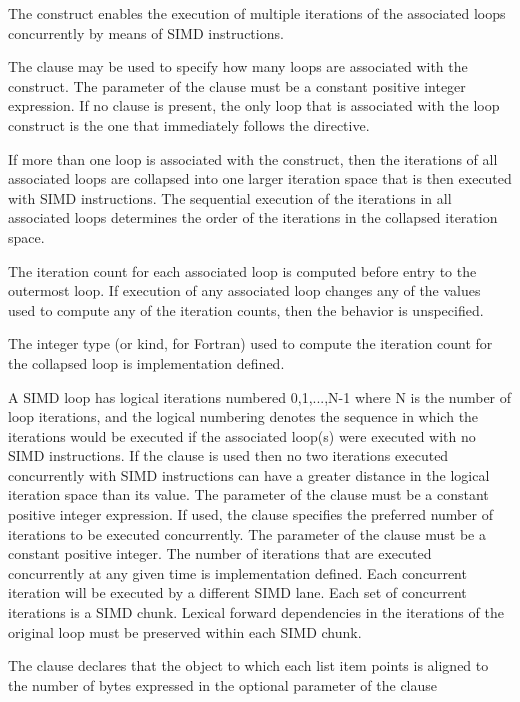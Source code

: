 \descr
The  construct enables the execution of multiple iterations of the associated loops 
concurrently by means of SIMD instructions.

The  clause may be used to specify how many loops are associated with the 
construct. The parameter of the  clause must be a constant positive integer 
expression. If no  clause is present, the only loop that is associated with the 
loop construct is the one that immediately follows the directive.

If more than one loop is associated with the  construct, then the iterations of all 
associated loops are collapsed into one larger iteration space that is then executed with 
SIMD instructions. The sequential execution of the iterations in all associated loops 
determines the order of the iterations in the collapsed iteration space.

The iteration count for each associated loop is computed before entry to the outermost 
loop. If execution of any associated loop changes any of the values used to compute any 
of the iteration counts, then the behavior is unspecified.

The integer type (or kind, for Fortran) used to compute the iteration count for the 
collapsed loop is implementation defined.

A SIMD loop has logical iterations numbered 0,1,...,N-1 where N is the number of loop 
iterations, and the logical numbering denotes the sequence in which the iterations would 
be executed if the associated loop(s) were executed with no SIMD instructions. If the 
 clause is used then no two iterations executed concurrently with SIMD 
instructions can have a greater distance in the logical iteration space than its value. The 
parameter of the  clause must be a constant positive integer expression. 
If used, the  clause specifies the preferred number of iterations to be executed concurrently. 
The parameter of the  clause must be a constant positive integer.
The number of iterations that are executed concurrently at any given time is implementation 
defined. Each concurrent iteration will be executed by a different SIMD lane. Each set 
of concurrent iterations is a SIMD chunk. Lexical forward dependencies in the iterations of the original loop must be preserved within each SIMD chunk.

\ccppspecificstart
The  clause declares that the object to which each list item points is aligned to 
the number of bytes expressed in the optional parameter of the  clause
\ccppspecificend

